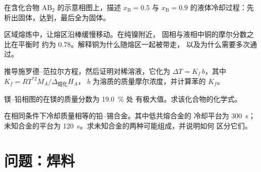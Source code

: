 \begin{exercise}[$\star\star$]\label{exo:b2:solid-liquid-diagrams:8}
在含化合物 $\mathrm{AB_2}$ 的示意相图上，描述
$x_{\mathrm B} = 0.5$ 与 $x_{\mathrm B} = 0.9$ 的液体冷却过程：先
析出固体，达到，最后全为固体。
\end{exercise}

\begin{exercise}[$\star\star$]\label{exo:b2:solid-liquid-diagrams:9}
区域熔炼中，让熔区沿棒缓慢移动。在纯镍附近，
固相与液相中铜的摩尔分数之比在平衡时
约为 0.78。解释铜为什么随熔区一起被带走，
以及为什么需要多次通过。
\end{exercise}

\begin{exercise}[$\star\star\star$]\label{exo:b2:solid-liquid-diagrams:10}
推导施罗德–范拉尔方程，然后证明对稀溶液，它化为
$\Delta T = K_f\,b$，其中 $K_f = RT^{*2}M_A/\Delta_{\text{熔化}}H_A$，
$b$ 为溶质的质量摩尔浓度，并计算苯的 $K_f$。
\end{exercise}

\begin{exercise}[$\star\star\star$]\label{exo:b2:solid-liquid-diagrams:11}
镁–铅相图的在镁的质量分数为 19.0~\% 处
有极大值。求该化合物的化学式。
\end{exercise}

\begin{exercise}[$\star\star\star$]\label{exo:b2:solid-liquid-diagrams:12}
在相同条件下冷却质量相等的铅–锡合金。其中低共熔合金的
冷却平台为 \qty{300}{s}；未知合金的平台为
\qty{120}{s}。求未知合金的两种可能组成，并说明如何
区分它们。
\end{exercise}

\section{问题：焊料}

